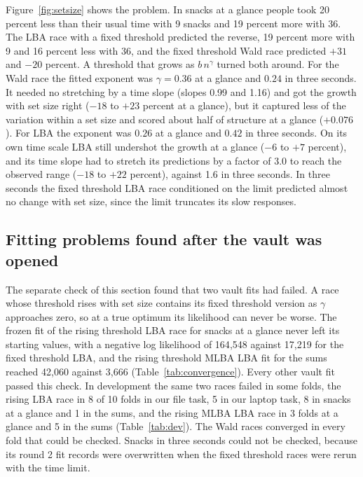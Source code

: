 \documentclass[11pt]{article}
\begin{document}
Figure~\ref{fig:setsize} shows the problem. In snacks at a glance people took 20 percent less than their usual time with 9 snacks and 19 percent more with 36. The LBA race with a fixed threshold predicted the reverse, 19 percent more with 9 and 16 percent less with 36, and the fixed threshold Wald race predicted $+31$ and $-20$ percent. A threshold that grows as $b\,n^{\gamma}$ turned both around. For the Wald race the fitted exponent was $\gamma = 0.36$ at a glance and $0.24$ in three seconds. It needed no stretching by a time slope (slopes 0.99 and 1.16) and got the growth with set size right ($-18$ to $+23$ percent at a glance), but it captured less of the variation within a set size and scored about half of structure at a glance ($+0.076$). For LBA the exponent was $0.26$ at a glance and $0.42$ in three seconds. On its own time scale LBA still undershot the growth at a glance ($-6$ to $+7$ percent), and its time slope had to stretch its predictions by a factor of 3.0 to reach the observed range ($-18$ to $+22$ percent), against 1.6 in three seconds. In three seconds the fixed threshold LBA race conditioned on the limit predicted almost no change with set size, since the limit truncates its slow responses.

\subsection{Fitting problems found after the vault was opened}
\label{sec:refit}



The separate check of this section found that two vault fits had failed. A race whose threshold rises with set size contains its fixed threshold version as $\gamma$ approaches zero, so at a true optimum its likelihood can never be worse. The frozen fit of the rising threshold LBA race for snacks at a glance never left its starting values, with a negative log likelihood of 164{,}548 against 17{,}219 for the fixed threshold LBA, and the rising threshold MLBA LBA fit for the sums reached 42{,}060 against 3{,}666 (Table~\ref{tab:convergence}). Every other vault fit passed this check. In development the same two races failed in some folds, the rising LBA race in 8 of 10 folds in our file task, 5 in our laptop task, 8 in snacks at a glance and 1 in the sums, and the rising MLBA LBA race in 3 folds at a glance and 5 in the sums (Table~\ref{tab:dev}). The Wald races converged in every fold that could be checked. Snacks in three seconds could not be checked, because its round 2 fit records were overwritten when the fixed threshold races were rerun with the time limit.
\end{document}
